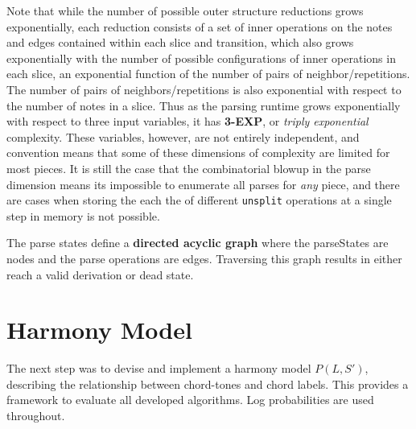 \documentclass[12pt,a4paper,twoside,openright]{report} \usepackage[pdfborder={0 0 0}]{hyperref}    %
\theoremstyle{definition} \newtheorem{definition}{Definition}[section]
\begin{document}
    Note that while the number of possible outer structure reductions grows exponentially, each reduction consists of
    a set of inner operations on the notes and edges contained within each slice and transition, which also grows
    exponentially with the number of possible configurations of inner operations in each slice, an exponential function
    of the number of pairs of neighbor/repetitions. The number of pairs of neighbors/repetitions is also exponential
    with respect to the number of notes in a slice. Thus as the parsing runtime grows exponentially with respect to
    three input variables, it has \textbf{3-EXP}, or \textit{triply exponential} complexity. These variables, however,
    are not entirely independent, and convention means that some of these dimensions of complexity are limited for most
    pieces. It is still the case that the combinatorial blowup in the parse dimension means its impossible to enumerate
    all parses for \textit{any} piece, and there are cases when storing the each the of different \texttt{unsplit}
    operations at a single step in memory is not possible.

    The parse states define a \textbf{directed acyclic graph} where the parseStates are nodes and the parse operations
    are edges. Traversing this graph results in either reach a valid derivation or dead state. 




    \section{Harmony Model}

    The next step was to devise and implement a harmony model $P(L,S')$, describing the relationship between chord-tones
    and chord labels. This provides a framework to evaluate all developed algorithms. Log probabilities are used
    throughout.
\end{document}
